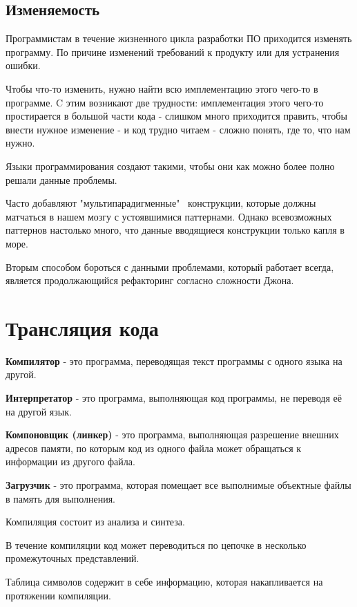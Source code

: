 \documentclass[oneside]{book}
\begin{document}
	\section{Изменяемость}
    Программистам в течение жизненного цикла
    разработки ПО приходится изменять программу.
    По причине изменений требований к продукту
    или для устранения ошибки.

    Чтобы что-то изменить,
    нужно найти всю имплементацию этого чего-то
    в программе. C этим возникают две
    трудности: имплементация этого чего-то
    простирается в большой части кода -
    слишком много приходится править, чтобы
    внести нужное изменение -
    и код трудно читаем - сложно понять,
    где то, что нам нужно.

    Языки программирования создают такими,
    чтобы они как можно более полно
    решали данные проблемы.

    Часто добавляют "мультипарадигменные" \
    конструкции, которые должны матчаться в нашем мозгу
    с устоявшимися паттернами. Однако всевозможных
    паттернов настолько много, что данные вводящиеся
    конструкции только капля в море.

    Вторым способом бороться с данными проблемами,
    который работает всегда, является продолжающийся
    рефакторинг согласно сложности Джона.

    \chapter{Трансляция кода}
    \textbf{Компилятор} - это программа,
    переводящая текст программы
    с одного языка на другой.

    \textbf{Интерпретатор} - это программа,
    выполняющая код программы,
    не переводя её на другой язык.

    \textbf{Компоновщик (линкер)} - это программа,
    выполняющая разрешение внешних
    адресов памяти, по которым код из одного
    файла может обращаться к информации из другого файла.

    \textbf{Загрузчик} - это программа,
    которая помещает все выполнимые
    объектные файлы в память для
    выполнения.

    Компиляция состоит из анализа и синтеза.

    В течение компиляции код может
    переводиться по цепочке в несколько
    промежуточных представлений.

    Таблица символов содержит в себе информацию,
    которая накапливается на протяжении компиляции.
\end{document}
